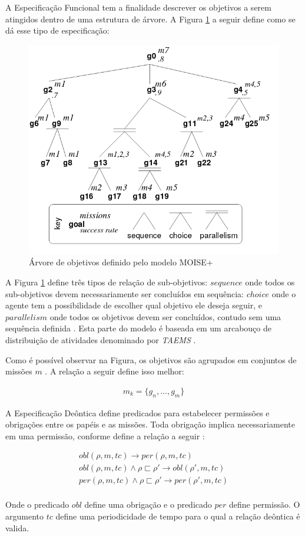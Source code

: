 A Especificação Funcional tem a finalidade descrever os objetivos a serem atingidos dentro de uma estrutura de árvore. A Figura \ref{arvoremoise} a seguir define como se dá esse tipo de especificação: 

\begin{figure}[H]
  \centering
  \includegraphics[width=0.8\linewidth]{figure/figmoise} 
  \caption{Árvore de objetivos definido pelo modelo MOISE+ \cite{moiseframework}}
  \label{arvoremoise}
\end{figure}

A Figura \ref{arvoremoise} define três tipos de relação de sub-objetivos: $sequence$ onde todos os sub-objetivos devem necessariamente ser concluídos em sequência: $choice$ onde o agente tem a possibilidade de escolher qual objetivo ele deseja seguir, e $parallelism$ onde todos os objetivos devem ser concluídos, contudo sem uma sequência definida \cite{taems01} \cite{taems02}. Esta parte do modelo é baseada em um arcabouço de distribuição de atividades denominado por \textit{TAEMS} \cite{TAEMS}. 

Como é possível observar na Figura, os objetivos são agrupados em conjuntos de missões $m$ \cite{dynamicagenttemporalstruct}. A relação a seguir define isso melhor:

\begin{eqnarray}
	m_k = \{ g_n,...,g_m\}
\end{eqnarray}


A Especificação Deôntica define predicados para estabelecer permissões e obrigações entre os papéis e as missões. Toda obrigação implica necessariamente em uma permissão, conforme define a relação a seguir \cite{moiseframework} \cite{deonticOne}: 

\begin{eqnarray}\nonumber \label{deonticRuleMoise}
	obl(\rho,m,tc) \to per(\rho,m,tc) \\
	obl(\rho,m,tc) \wedge \rho \sqsubset \rho' \to obl(\rho',m,tc) \\
	per(\rho,m,tc) \wedge \rho \sqsubset \rho' \to per(\rho',m,tc) \\	
\end{eqnarray}

Onde o predicado $obl$ define uma obrigação e o predicado $per$ define permissão. O argumento $tc$ define uma periodicidade de tempo para o qual a relação deôntica é valida. 